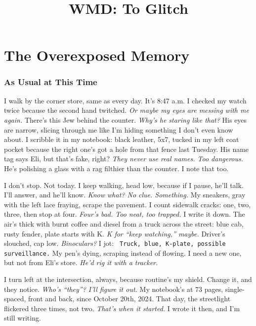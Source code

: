 \documentclass[12pt]{article}
\title{WMD: To Glitch}
\author{}
\date{}
\newcommand{\note}[1]{\texttt{\small \color{DarkGray} #1}}
\begin{document}
\maketitle
\tableofcontents
\newpage

\part{The Overexposed Memory}

\section{As Usual at This Time}

I walk by the corner store, same as every day. It’s 8:47 a.m. I checked my watch twice because the second hand twitched. \textit{Or maybe my eyes are messing with me again.} There’s this Jew behind the counter. \textit{Why’s he staring like that?} His eyes are narrow, slicing through me like I’m hiding something I don’t even know about. I scribble it in my notebook: black leather, 5x7, tucked in my left coat pocket because the right one’s got a hole from that fence last Tuesday. His name tag says \textnormal{Eli}, but that’s fake, right? \textit{They never use real names. Too dangerous.} He’s polishing a glass with a rag filthier than the counter. I note that too.

I don’t stop. Not today. I keep walking, head low, because if I pause, he’ll talk. I’ll answer, and he’ll know. \textit{Know what? No clue. Something.} My sneakers, gray with the left lace fraying, scrape the pavement. I count sidewalk cracks: one, two, three, then stop at four. \textit{Four’s bad. Too neat, too trapped.} I write it down. The air’s thick with burnt coffee and diesel from a truck across the street: blue cab, rusty fender, plate starts with K. \textit{K for “keep watching,” maybe.} Driver’s slouched, cap low. \textit{Binoculars?} I jot: \note{Truck, blue, K-plate, possible surveillance.} My pen’s dying, scraping instead of flowing. I need a new one, but not from \textnormal{Eli}’s store. \textit{He’d rig it with a tracker.}

I turn left at the intersection, always, because routine’s my shield. Change it, and they notice. \textit{Who’s “they”? I’ll figure it out.} My notebook’s at 73 pages, single-spaced, front and back, since October 20th, 2024. That day, the streetlight flickered three times, not two. \textit{That’s when it started.} I wrote it then, and I’m still writing.
\end{document}
